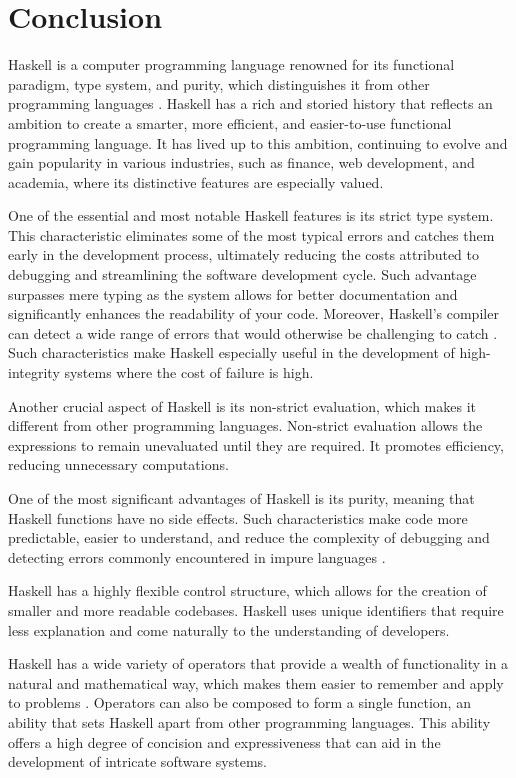 \documentclass[a4paper, titlepage, twoside]{article}
\begin{document}
\section{Conclusion}
\label{sec:org2e677d7}

Haskell is a computer programming language renowned for its functional paradigm, type system, and purity, which distinguishes it from other programming languages \autocite{marlowParallelConcurrentProgramming2013}. Haskell has a rich and storied history that reflects an ambition to create a smarter, more efficient, and easier-to-use functional programming language. It has lived up to this ambition, continuing to evolve and gain popularity in various industries, such as finance, web development, and academia, where its distinctive features are especially valued.

One of the essential and most notable Haskell features is its strict type system. This characteristic eliminates some of the most typical errors and catches them early in the development process, ultimately reducing the costs attributed to debugging and streamlining the software development cycle. Such advantage surpasses mere typing as the system allows for better documentation and significantly enhances the readability of your code. Moreover, Haskell's compiler can detect a wide range of errors that would otherwise be challenging to catch \autocite{huttonProgrammingHaskell2007}. Such characteristics make Haskell especially useful in the development of high-integrity systems where the cost of failure is high.

Another crucial aspect of Haskell is its non-strict evaluation, which makes it different from other programming languages. Non-strict evaluation allows the expressions to remain unevaluated until they are required. It promotes efficiency, reducing unnecessary computations.

One of the most significant advantages of Haskell is its purity, meaning that Haskell functions have no side effects. Such characteristics make code more predictable, easier to understand, and reduce the complexity of debugging and detecting errors commonly encountered in impure languages \autocite{huttonProgrammingHaskell2007}.

Haskell has a highly flexible control structure, which allows for the creation of smaller and more readable codebases. Haskell uses unique identifiers that require less explanation and come naturally to the understanding of developers.

Haskell has a wide variety of operators that provide a wealth of functionality in a natural and mathematical way, which makes them easier to remember and apply to problems \autocite{huttonProgrammingHaskell2007}. Operators can also be composed to form a single function, an ability that sets Haskell apart from other programming languages. This ability offers a high degree of concision and expressiveness that can aid in the development of intricate software systems.
\end{document}
